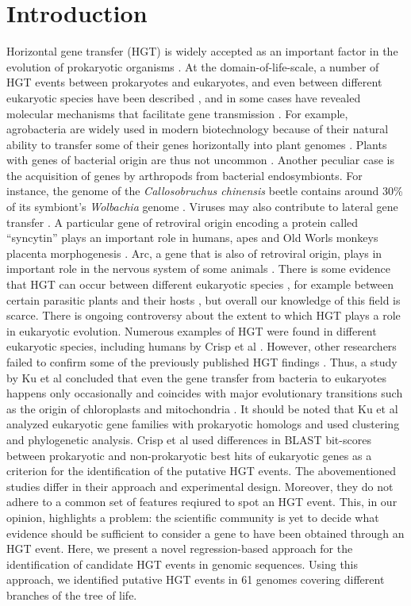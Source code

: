 \section{Introduction} \label{intro} Horizontal gene transfer (HGT) is widely
accepted as an important factor in the evolution of prokaryotic organisms
\cite{Ochman2000}. At the domain-of-life-scale, a number of HGT events between
prokaryotes and eukaryotes, and even between different eukaryotic species have
been described \cite{Danchin2016a}, and in some cases have revealed molecular
mechanisms that facilitate gene transmission \cite{Soucy2015}. For example,
agrobacteria are widely used in modern biotechnology because of their natural
ability to transfer some of their genes horizontally into plant genomes
\cite{Chilton1977}. Plants with genes of bacterial origin are thus not uncommon
\cite{Kyndt2015} \cite{Matveeva2012} \cite{Matveeva2014}. Another peculiar case
is the acquisition of genes by arthropods from bacterial endosymbionts. For
instance, the genome of the \textit{Callosobruchus chinensis} beetle contains
around 30\% of its symbiont's \textit{Wolbachia} genome \cite{Nikoh2008}.
Viruses may also contribute to lateral gene transfer \cite{Drezen2017}. A
particular gene of retroviral origin encoding a protein called ``syncytin''
plays an important role in humans, apes and Old Worls monkeys placenta
morphogenesis \cite{Mi2000}. Arc, a gene that is also of retroviral origin,
plays in important role in the nervous system of some animals
\cite{Pastuzyn2018}. There is some evidence that HGT can occur between
different eukaryotic species \cite{Soucy2015}, for example between certain
parasitic plants and their hosts \cite{Yoshida2010} \cite{Xi2012}
\cite{Zhang2013} \cite{Zhang2014}, but overall our knowledge of this field is
scarce. There is ongoing controversy about the extent to which HGT plays a role
in eukaryotic evolution. Numerous examples of HGT were found in different
eukaryotic species, including humans by Crisp et al \cite{Crisp2015}. However,
other researchers failed to confirm some of the previously published HGT
findings \cite{Salzberg2017}. Thus, a study by Ku et al concluded that even the
gene transfer from bacteria to eukaryotes happens only occasionally and
coincides with major evolutionary transitions such as the origin of
chloroplasts and mitochondria \cite{Ku2015}. It should be noted that Ku et al
analyzed eukaryotic gene families with prokaryotic homologs and used clustering
and phylogenetic analysis. Crisp et al used differences in BLAST bit-scores
between prokaryotic and non-prokaryotic best hits of eukaryotic genes as a
criterion for the identification of the putative HGT events. The abovementioned
studies differ in their approach and experimental design.  Moreover, they do
not adhere to a common set of features reqiured to spot an HGT event. This, in
our opinion, highlights a problem: the scientific community is yet to decide
what evidence should be sufficient to consider a gene to have been obtained
through an HGT event. Here, we present a novel regression-based approach for
the identification of candidate HGT events in genomic sequences.  Using this
approach, we identified putative HGT events in 61 genomes covering different
branches of the tree of life.
